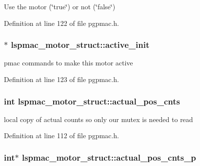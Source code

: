Use the motor (\char`\"{}true\char`\"{}) or not (\char`\"{}false\char`\"{}) 



Definition at line 122 of file pgpmac.\-h.

\hypertarget{structlspmac__motor__struct_ac2a02f137e4a35db816bc728290d3558}{
\subsubsection[{active\-\_\-init}]{$\ast$ lspmac\-\_\-motor\-\_\-struct\-::active\-\_\-init}}\label{structlspmac__motor__struct_ac2a02f137e4a35db816bc728290d3558}


pmac commands to make this motor active 



Definition at line 123 of file pgpmac.\-h.

\hypertarget{structlspmac__motor__struct_ae5c7aea45b9637a1817be246688fd980}{
\subsubsection[{actual\-\_\-pos\-\_\-cnts}]{\setlength{\rightskip}{0pt plus 5cm}int lspmac\-\_\-motor\-\_\-struct\-::actual\-\_\-pos\-\_\-cnts}}\label{structlspmac__motor__struct_ae5c7aea45b9637a1817be246688fd980}


local copy of actual counts so only our mutex is needed to read 



Definition at line 112 of file pgpmac.\-h.

\hypertarget{structlspmac__motor__struct_a312047bb71def5cd2443fecd875eaea5}{
\subsubsection[{actual\-\_\-pos\-\_\-cnts\-\_\-p}]{\setlength{\rightskip}{0pt plus 5cm}int$\ast$ lspmac\-\_\-motor\-\_\-struct\-::actual\-\_\-pos\-\_\-cnts\-\_\-p}}\label{structlspmac__motor__struct_a312047bb71def5cd2443fecd875eaea5}


